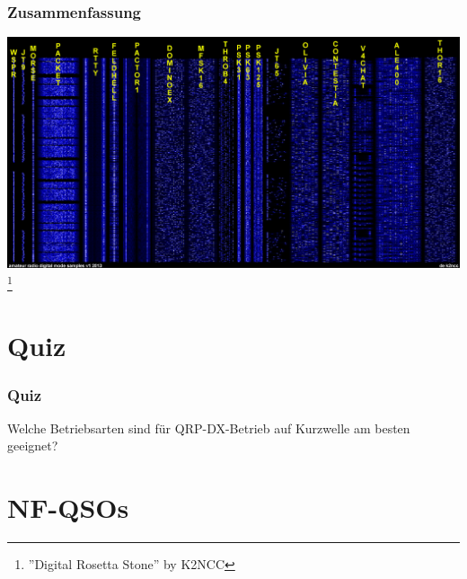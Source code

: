 \begin{frame}
    \frametitle{Zusammenfassung}

    \begin{center}
        \includegraphics[width=1\textwidth]{e16/Digital_Rosetta_Stone.jpg}
        \footnote{''Digital Rosetta Stone'' by K2NCC}
    \end{center}

\end{frame}

\section{Quiz}

\begin{frame}
    \frametitle{Quiz}

    \begin{block}{Welche Betriebsarten sind für QRP-DX-Betrieb auf Kurzwelle am
    besten geeignet?}
    \end{block}



\end{frame}

\section{NF-QSOs}

